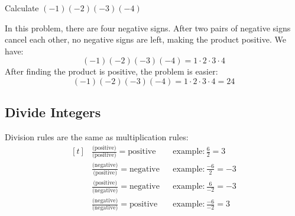 \begin{myexample}
Calculate $(-1)(-2)(-3)(-4)$
\end{myexample}
\begin{solution}
In this problem, there are four negative signs. After two pairs of negative signs cancel each other, no negative signs are left, making the product positive. We have:
	\[ (-1)(-2)(-3)(-4)=1\cdot2\cdot3\cdot4 \]
After finding the product is positive, the problem is easier:
	\[ (-1)(-2)(-3)(-4)=1\cdot2\cdot3\cdot4 = 24 \]
\end{solution}

\subsection{Divide Integers}
Division rules are the same as multiplication rules:
\[
\begin{aligned}[t]
	&\frac{\text{(positive)}}{\text{(positive)}}=\text{positive}&&\text{example}: \frac{6}{2}=3\\
	&\frac{\text{(negative)}}{\text{(positive)}}=\text{negative}&&\text{example}: \frac{-6}{2}=-3\\
	&\frac{\text{(positive)}}{\text{(negative)}}=\text{negative}&&\text{example}: \frac{6}{-2}=-3\\
	&\frac{\text{(negative)}}{\text{(negative)}}=\text{positive}&&\text{example}: \frac{-6}{-2}=3\\
\end{aligned}
\]

